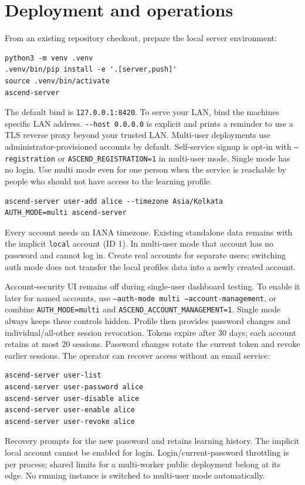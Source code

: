 \hypertarget{deployment}{%
\section{Deployment and operations}\label{deployment}}

From an existing repository checkout, prepare the local server environment:
\begin{verbatim}
python3 -m venv .venv
.venv/bin/pip install -e '.[server,push]'
source .venv/bin/activate
ascend-server
\end{verbatim}
The default bind is \texttt{127.0.0.1:8420}.
To serve your LAN, bind the machine\textquotesingle s specific LAN
address. \texttt{-\/-host 0.0.0.0} is explicit and prints a reminder to
use a TLS reverse proxy beyond your trusted LAN. Multi-user deployments
use administrator-provisioned accounts by default. Self-service signup is opt-in
with \texttt{--registration} or \texttt{ASCEND\_REGISTRATION=1} in multi-user mode.
Single mode has no login. Use multi mode even for one person when the service
is reachable by people who should not have access to the learning profile.

\begin{verbatim}
ascend-server user-add alice --timezone Asia/Kolkata
AUTH_MODE=multi ascend-server
\end{verbatim}

Every account needs an IANA timezone. Existing standalone data remains
with the implicit \texttt{local} account (ID 1). In multi-user mode that
account has no password and cannot log in. Create real accounts for
separate users; switching auth mode does not transfer the local
profile\textquotesingle s data into a newly created account.

Account-security UI remains off during single-user dashboard testing. To enable
it later for named accounts, use \texttt{--auth-mode multi --account-management},
or combine \texttt{AUTH\_MODE=multi} and \texttt{ASCEND\_ACCOUNT\_MANAGEMENT=1}.
Single mode always keeps these controls hidden. Profile then provides password
changes and individual/all-other session revocation. Tokens expire after 30 days;
each account retains at most 20 sessions. Password changes rotate the current
token and revoke earlier sessions. The operator can recover access without an
email service:
\begin{verbatim}
ascend-server user-list
ascend-server user-password alice
ascend-server user-disable alice
ascend-server user-enable alice
ascend-server user-revoke alice
\end{verbatim}
Recovery prompts for the new password and retains learning history. The implicit
local account cannot be enabled for login. Login/current-password throttling is
per process; shared limits for a multi-worker public deployment belong at its
edge. No running instance is switched to multi-user mode automatically.

